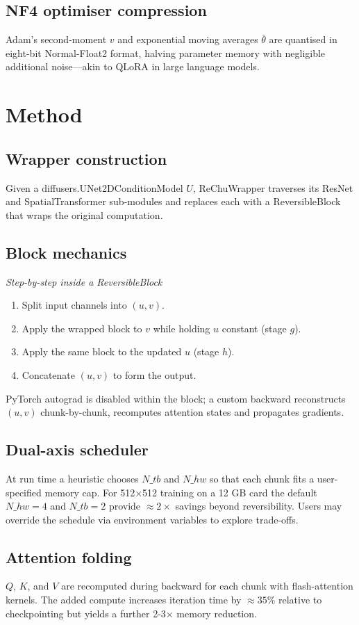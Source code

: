 \documentclass{article}
\begin{document}
\subsection{NF4 optimiser compression}
Adam's second-moment \(v\) and exponential moving averages \(\bar{\theta}\) are quantised in eight-bit Normal-Float2 format, halving parameter memory with negligible additional noise—akin to QLoRA in large language models.

\section{Method}
\subsection{Wrapper construction}
Given a diffusers.UNet2DConditionModel \(U\), ReChuWrapper traverses its ResNet and SpatialTransformer sub-modules and replaces each with a ReversibleBlock that wraps the original computation.

\subsection{Block mechanics}
\textit{Step-by-step inside a ReversibleBlock}
\begin{enumerate}
\item Split input channels into \((u, v)\).
\item Apply the wrapped block to \(v\) while holding \(u\) constant (stage \(g\)).
\item Apply the same block to the updated \(u\) (stage \(h\)).
\item Concatenate \((u, v)\) to form the output.
\end{enumerate}
PyTorch autograd is disabled within the block; a custom backward reconstructs \((u, v)\) chunk-by-chunk, recomputes attention states and propagates gradients.

\subsection{Dual-axis scheduler}
At run time a heuristic chooses \(N\_{tb}\) and \(N\_{hw}\) so that each chunk fits a user-specified memory cap. For 512×512 training on a 12 GB card the default \(N\_{hw} = 4\) and \(N\_{tb} = 2\) provide \(\approx 2\times\) savings beyond reversibility. Users may override the schedule via environment variables to explore trade-offs.

\subsection{Attention folding}
\(Q\), \(K\), and \(V\) are recomputed during backward for each chunk with flash-attention kernels. The added compute increases iteration time by \(\approx 35\%\) relative to checkpointing but yields a further 2-3× memory reduction.
\end{document}
